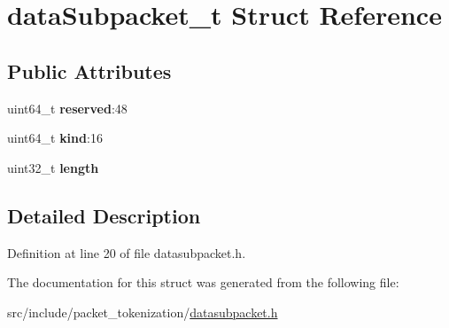 \hypertarget{structdataSubpacket__t}{}\section{data\+Subpacket\+\_\+t Struct Reference}
\label{structdataSubpacket__t}
\subsection*{Public Attributes}
\begin{DoxyCompactItemize}
\item 
\hypertarget{structdataSubpacket__t_ab906efa54fa9a16ce438b0befaad198f}{}uint64\+\_\+t {\bfseries reserved}\+:48\label{structdataSubpacket__t_ab906efa54fa9a16ce438b0befaad198f}

\item 
\hypertarget{structdataSubpacket__t_ad5a9e142e9a008dac01b695b1e36deff}{}uint64\+\_\+t {\bfseries kind}\+:16\label{structdataSubpacket__t_ad5a9e142e9a008dac01b695b1e36deff}

\item 
\hypertarget{structdataSubpacket__t_a143eebdb5c7852c20ecb7cc146b9c08c}{}uint32\+\_\+t {\bfseries length}\label{structdataSubpacket__t_a143eebdb5c7852c20ecb7cc146b9c08c}

\end{DoxyCompactItemize}


\subsection{Detailed Description}


Definition at line 20 of file datasubpacket.\+h.



The documentation for this struct was generated from the following file\+:\begin{DoxyCompactItemize}
\item 
src/include/packet\+\_\+tokenization/\hyperlink{datasubpacket_8h}{datasubpacket.\+h}\end{DoxyCompactItemize}
